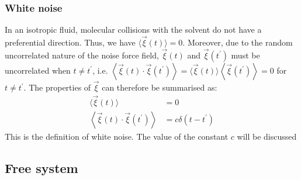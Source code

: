 \documentclass[12pt,a4paper]{article}
\begin{document}
\subsubsection{White noise}
In an isotropic fluid, molecular collisions with the solvent do not have a preferential direction. Thus, we have $\langle\vec{\xi}(t)\rangle=0$. Moreover, due to the random uncorrelated nature of the noise force field, $\vec{\xi}(t)$ and $\vec{\xi}\left(t^{\prime}\right)$ must be uncorrelated when $t \neq t^{\prime}$, i.e. $\left\langle\vec{\xi}(t) \cdot \vec{\xi}\left(t^{\prime}\right)\right\rangle=\langle\vec{\xi}(t)\rangle\left\langle\vec{\xi}\left(t^{\prime}\right)\right\rangle=0$ for $t \neq t^{\prime}$. The properties of $\vec{\xi}$ can therefore be summarised as:
$$
\begin{aligned}
\langle\vec{\xi}(t)\rangle & =0 \\
\left\langle\vec{\xi}(t) \cdot \vec{\xi}\left(t^{\prime}\right)\right\rangle & =c \delta\left(t-t^{\prime}\right)
\end{aligned}
$$
This is the definition of white noise. The value of the constant $c$ will be discussed
\subsection{Free system}
\end{document}
